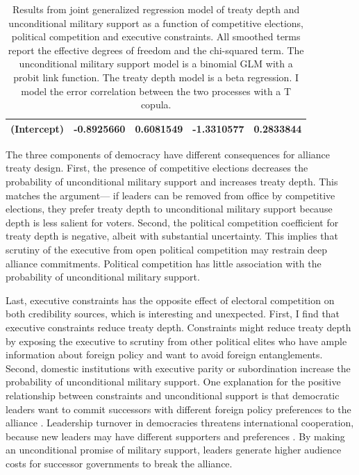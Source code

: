 \documentclass[12pt]{article}
\begin{document}
\begin{table}[ht]
\begin{tabular}{lrrrr}
  (Intercept) & -0.8925660 & 0.6081549 & -1.3310577 & 0.2833844 \\
   \hline
\end{tabular}
\caption{Results from joint generalized regression model of treaty depth and unconditional military support as a function of competitive elections, political competition and executive constraints. 
                     All smoothed terms report the effective degrees of freedom and the chi-squared term. 
                     The unconditional military support model is a binomial GLM with a probit link function. 
                     The treaty depth model is a beta regression. 
                     I model the error correlation between the two processes with a T copula.} 
\label{tab:gjrm-res-split}
\end{table}


The three components of democracy have different consequences for alliance treaty design.
First, the presence of competitive elections decreases the probability of unconditional military support and increases treaty depth.
This matches the argument--- if leaders can be removed from office by competitive elections, they prefer treaty depth to unconditional military support because depth is less salient for voters. 
Second, the political competition coefficient for treaty depth is negative, albeit with substantial uncertainty. 
This implies that scrutiny of the executive from open political competition may restrain deep alliance commitments. 
Political competition has little association with the probability of unconditional military support. 


Last, executive constraints has the opposite effect of electoral competition on both credibility sources, which is interesting and unexpected.
First, I find that executive constraints reduce treaty depth.  
Constraints might reduce treaty depth by exposing the executive to scrutiny from other political elites who have ample information about foreign policy and want to avoid foreign entanglements.  
Second, domestic institutions with executive parity or subordination increase the probability of unconditional military support.  
One explanation for the positive relationship between constraints and unconditional support is that democratic leaders want to commit successors with different foreign policy preferences to the alliance \cite{Mattes2012a}. 
Leadership turnover in democracies threatens international cooperation, because new leaders may have different supporters and preferences \citep{Lobell2004, Narizny2007, Leedsetal2009}. 
By making an unconditional promise of military support, leaders generate higher audience costs for successor governments to break the alliance. 
\end{document}
